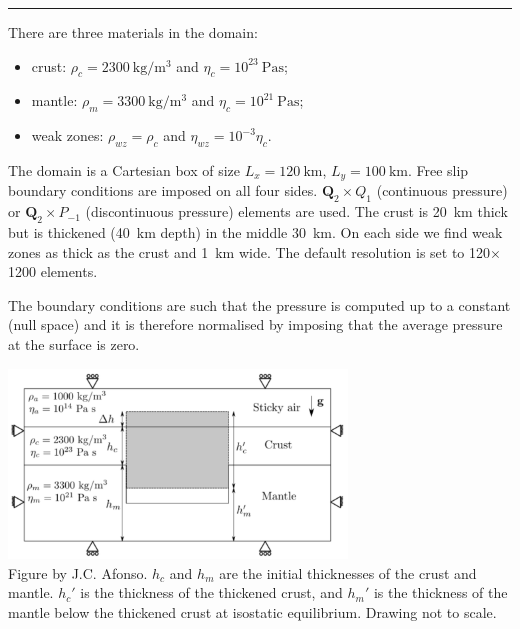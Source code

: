 \par\noindent\rule{\textwidth}{0.4pt}




There are three materials in the domain:
\begin{itemize}
\item crust: $\rho_{c}=2300~\si{\kg\per\cubic\meter}$ and $\eta_{c}=10^{23}~\si{\pascal\second}$;
\item mantle: $\rho_{m}=3300~\si{\kg\per\cubic\meter}$ and $\eta_{c}=10^{21}~\si{\pascal\second}$;
\item weak zones: $\rho_{wz}=\rho_{c}$ and $\eta_{wz}=10^{-3}\eta_{c}$.
\end{itemize}
The domain is a Cartesian box of size $L_x=120~\si{\km}$, $L_y=100~\si{\km}$.
Free slip boundary conditions are imposed on all four sides. ${\bm Q}_2 \times Q_1$ 
(continuous pressure)
or ${\bm Q}_2\times P_{-1}$ (discontinuous pressure) elements are used.
The crust is 20~\si{\km} thick but is thickened (40~\si{\km} depth) in the middle 30~\si{\km}.
On each side we find weak zones as thick as the crust and 1~\si{\km} wide. 
The default resolution is set to 120$\times$1200 elements.

The boundary conditions are such that the pressure is computed up to a constant (null space)
and it is therefore normalised by imposing that the average pressure at the surface is zero.

\begin{center}
\includegraphics[width=9cm]{python_codes/fieldstone_160/images/setup}\\
{\captionfont Figure by J.C. Afonso. $h_c$ and $h_m$ are the initial thicknesses of the crust and 
mantle. $h_c'$ is the thickness of the thickened crust, and $h_m'$ is the thickness of the 
mantle below the thickened crust at isostatic equilibrium. Drawing not to scale.}
\end{center}


